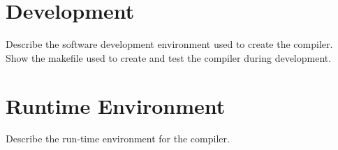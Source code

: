 \section{Development}
Describe the software development environment used to create the compiler.
Show the makefile used to create and test the compiler during development.

\section{Runtime Environment}
Describe the run-time environment for the compiler.
